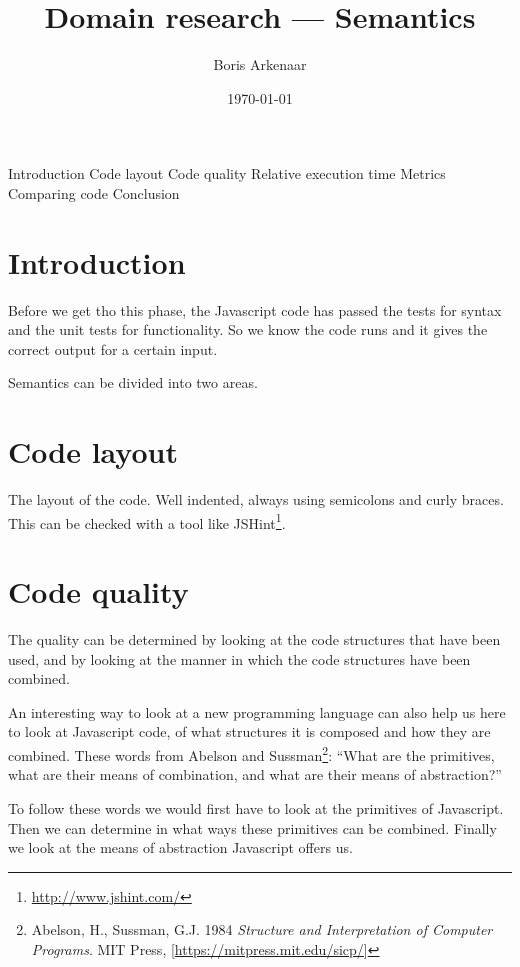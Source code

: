 \documentclass{article}
\begin{document}
 

\title{Domain research --- Semantics}
\author{Boris Arkenaar}
\date{\today}
\maketitle 

Introduction
Code layout
Code quality
  Relative execution time
  Metrics
Comparing code
Conclusion

\section{Introduction} 

Before we get tho this phase, the Javascript code has passed the tests for
syntax and the unit tests for functionality. So we know the code runs and it
gives the correct output for a certain input.

Semantics can be divided into two areas.

\section{Code layout}

The layout of the code. Well indented, always using semicolons and curly
braces. This can be checked with a tool like
JSHint\footnote{\url{http://www.jshint.com/}}.

\section{Code quality}

The quality can be determined by looking at the code structures that have been
used, and by looking at the manner in which the code structures have been
combined.

An interesting way to look at a new programming language can also help us here
to look at Javascript code, of what structures it is composed and how they are
combined. These words from Abelson and Sussman\footnote{Abelson, H., Sussman,
G.J. 1984 {\em Structure and Interpretation of Computer Programs}. MIT Press,
[\url{https://mitpress.mit.edu/sicp/}]}: ``What are the primitives, what are
their means of combination, and what are their means of abstraction?''

To follow these words we would first have to look at the primitives of
Javascript. Then we can determine in what ways these primitives can be
combined. Finally we look at the means of abstraction Javascript offers us.
\end{document}

